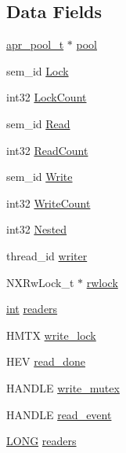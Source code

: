 \subsection*{Data Fields}
\begin{DoxyCompactItemize}
\item 
\hyperlink{structapr__pool__t}{apr\+\_\+pool\+\_\+t} $\ast$ \hyperlink{structapr__thread__rwlock__t_a20241ee40d7423d9ae3c1cfa74a4b6c8}{pool}
\item 
sem\+\_\+id \hyperlink{structapr__thread__rwlock__t_a1d408f47a24f3c6400a81dd3fbbf148a}{Lock}
\item 
int32 \hyperlink{structapr__thread__rwlock__t_a4cccf3fe3dfcd05f17c23db816ed83a0}{Lock\+Count}
\item 
sem\+\_\+id \hyperlink{structapr__thread__rwlock__t_a3c8fbeb2cdf01195b7e467b513215527}{Read}
\item 
int32 \hyperlink{structapr__thread__rwlock__t_a16110f05f23434db18b7dcf8eb8fb825}{Read\+Count}
\item 
sem\+\_\+id \hyperlink{structapr__thread__rwlock__t_a6acf442957f11834589a86ca9129e9f0}{Write}
\item 
int32 \hyperlink{structapr__thread__rwlock__t_a567cae2d82641fa7e7c88ba91d0797fc}{Write\+Count}
\item 
int32 \hyperlink{structapr__thread__rwlock__t_a53bc9d37e43ab5eafcd7b2253e29724d}{Nested}
\item 
thread\+\_\+id \hyperlink{structapr__thread__rwlock__t_a18110373a77fa08c50177cc517a7b4a2}{writer}
\item 
N\+X\+Rw\+Lock\+\_\+t $\ast$ \hyperlink{structapr__thread__rwlock__t_a8c70729c99deea4cc87fcf4a86e9557a}{rwlock}
\item 
\hyperlink{pcre_8txt_a42dfa4ff673c82d8efe7144098fbc198}{int} \hyperlink{structapr__thread__rwlock__t_ab8638740d20adc387e147b64e268c5ae}{readers}
\item 
H\+M\+TX \hyperlink{structapr__thread__rwlock__t_a493035e2c36f15766f3642a93a3d2914}{write\+\_\+lock}
\item 
H\+EV \hyperlink{structapr__thread__rwlock__t_a904c730f204f04dc171174b045463075}{read\+\_\+done}
\item 
H\+A\+N\+D\+LE \hyperlink{structapr__thread__rwlock__t_abf5aa056b9db8095082d12372f531e3a}{write\+\_\+mutex}
\item 
H\+A\+N\+D\+LE \hyperlink{structapr__thread__rwlock__t_ae30c25f4756c85054f530db78b4403b6}{read\+\_\+event}
\item 
\hyperlink{mod__mime__magic_8c_acaa7b8a7167a8214f499c71c413ddcca}{L\+O\+NG} \hyperlink{structapr__thread__rwlock__t_a0a7f396f5a9ead8e61ec379f2971f856}{readers}
\end{DoxyCompactItemize}


